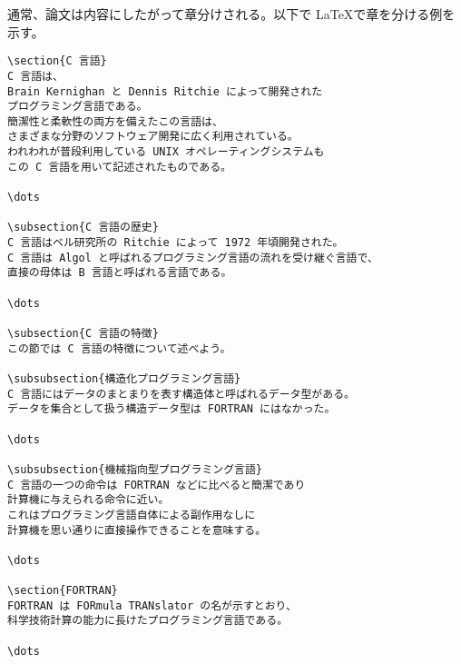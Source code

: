 通常、論文は内容にしたがって章分けされる。以下で \LaTeX で章を分ける例を示す。
\begin{reidai}
    \begin{verbatim}
\section{C 言語}
C 言語は、
Brain Kernighan と Dennis Ritchie によって開発された
プログラミング言語である。
簡潔性と柔軟性の両方を備えたこの言語は、
さまざまな分野のソフトウェア開発に広く利用されている。
われわれが普段利用している UNIX オペレーティングシステムも
この C 言語を用いて記述されたものである。

\dots

\subsection{C 言語の歴史}
C 言語はベル研究所の Ritchie によって 1972 年頃開発された。
C 言語は Algol と呼ばれるプログラミング言語の流れを受け継ぐ言語で、
直接の母体は B 言語と呼ばれる言語である。

\dots

\subsection{C 言語の特徴}
この節では C 言語の特徴について述べよう。

\subsubsection{構造化プログラミング言語}
C 言語にはデータのまとまりを表す構造体と呼ばれるデータ型がある。
データを集合として扱う構造データ型は FORTRAN にはなかった。

\dots

\subsubsection{機械指向型プログラミング言語}
C 言語の一つの命令は FORTRAN などに比べると簡潔であり
計算機に与えられる命令に近い。
これはプログラミング言語自体による副作用なしに
計算機を思い通りに直接操作できることを意味する。

\dots

\section{FORTRAN}
FORTRAN は FORmula TRANslator の名が示すとおり、
科学技術計算の能力に長けたプログラミング言語である。

\dots
\end{verbatim}
\end{reidai} \noindent
